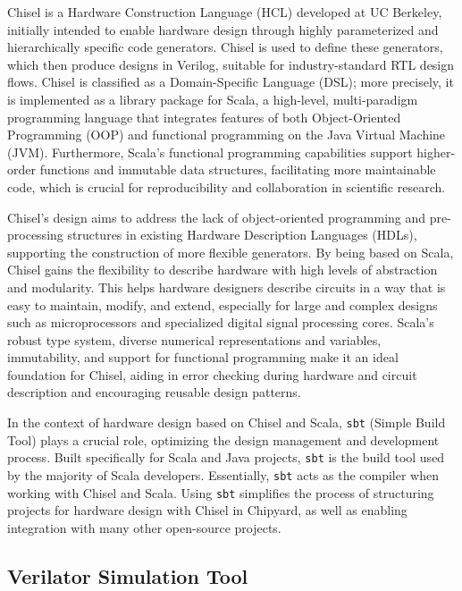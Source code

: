 Chisel is a Hardware Construction Language (HCL) developed at UC Berkeley, initially intended to enable hardware design through highly parameterized and hierarchically specific code generators. Chisel is used to define these generators, which then produce designs in Verilog, suitable for industry-standard RTL design flows. Chisel is classified as a Domain-Specific Language (DSL); more precisely, it is implemented as a library package for Scala, a high-level, multi-paradigm programming language that integrates features of both Object-Oriented Programming (OOP) and functional programming on the Java Virtual Machine (JVM). Furthermore, Scala's functional programming capabilities support higher-order functions and immutable data structures, facilitating more maintainable code, which is crucial for reproducibility and collaboration in scientific research.

Chisel's design aims to address the lack of object-oriented programming and pre-processing structures in existing Hardware Description Languages (HDLs), supporting the construction of more flexible generators. By being based on Scala, Chisel gains the flexibility to describe hardware with high levels of abstraction and modularity. This helps hardware designers describe circuits in a way that is easy to maintain, modify, and extend, especially for large and complex designs such as microprocessors and specialized digital signal processing cores. Scala's robust type system, diverse numerical representations and variables, immutability, and support for functional programming make it an ideal foundation for Chisel, aiding in error checking during hardware and circuit description and encouraging reusable design patterns.

In the context of hardware design based on Chisel and Scala, \texttt{sbt} (Simple Build Tool) plays a crucial role, optimizing the design management and development process. Built specifically for Scala and Java projects, \texttt{sbt} is the build tool used by the majority of Scala developers. Essentially, \texttt{sbt} acts as the compiler when working with Chisel and Scala. Using \texttt{sbt} simplifies the process of structuring projects for hardware design with Chisel in Chipyard, as well as enabling integration with many other open-source projects.

\subsection{Verilator Simulation Tool}
\label{subsec:verilator}

